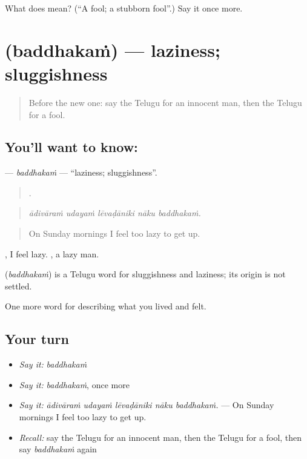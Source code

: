 \begin{tcolorbox}[breakable,colback=teal!4,colframe=teal!35!black,title={Before you move on}]
What does  mean? (\textquotedblleft{}A fool; a stubborn fool\textquotedblright{}.) Say it once more.
\end{tcolorbox}
\section[\texorpdfstring{\te{బద్ధకం} (baddhakaṁ)}{బద్ధకం (baddhakaṁ)}]{ (baddhakaṁ) — laziness; sluggishness}

\label{lesson:TE-C509-baddhakam}



\begin{quote}
Before the new one: say the Telugu for an innocent man, then the Telugu for a fool.
\end{quote}

\subsection*{You'll want to know: }
\textbf{} — \emph{baddhakaṁ} — \textquotedblleft{}laziness; sluggishness\textquotedblright{}.

\begin{quote}
    .
\end{quote}

\begin{quote}
\emph{ādivāraṁ udayaṁ lēvaḍāniki nāku baddhakaṁ.}
\end{quote}

\begin{quote}
On Sunday mornings I feel too lazy to get up.
\end{quote}

  , I feel lazy. , a lazy man.

\begin{cousinweb}
\textbf{} (\emph{baddhakaṁ}) is a Telugu word for sluggishness and laziness; its origin is not settled.
\end{cousinweb}

\begin{grammarlens}[title={What you've built}]
One more word for describing what you lived and felt.
\end{grammarlens}

\subsection*{Your turn}
\begin{itemize}
\raggedright
  \item \emph{Say it:} \emph{baddhakaṁ}
  \item \emph{Say it:} \emph{baddhakaṁ}, once more
  \item \emph{Say it:} \emph{ādivāraṁ udayaṁ lēvaḍāniki nāku baddhakaṁ.} — On Sunday mornings I feel too lazy to get up.
  \item \emph{Recall:} say the Telugu for an innocent man, then the Telugu for a fool, then say \emph{baddhakaṁ} again
\end{itemize}

